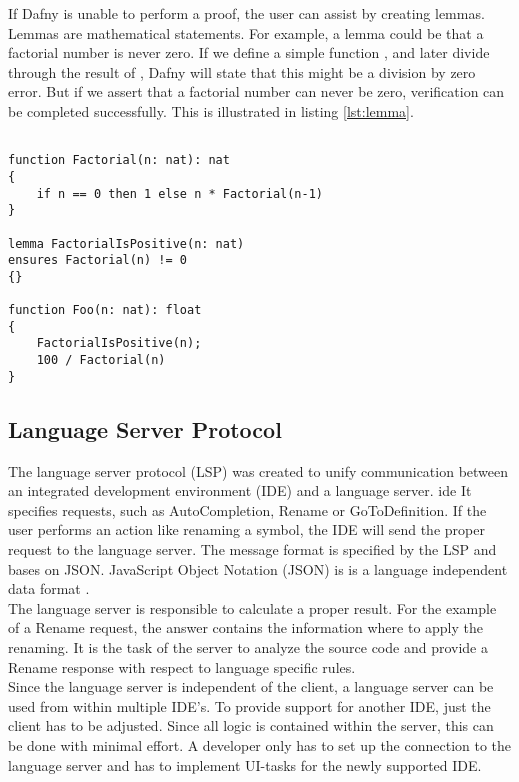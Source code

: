 If Dafny is unable to perform a proof, the user can assist by creating lemmas.
Lemmas are mathematical statements.
For example, a lemma could be that a factorial number is never zero.
If we define a simple function , and later divide through the result of , Dafny will state that this might be a division by zero error.
But if we assert that a factorial number can never be zero, verification can be completed successfully.
This is illustrated in listing \ref{lst:lemma}.
\begin{lstlisting}[language=dafny, caption={Lemma Example for Factorial}, captionpos=b, label={lst:lemma}]

function Factorial(n: nat): nat
{
    if n == 0 then 1 else n * Factorial(n-1)
}

lemma FactorialIsPositive(n: nat)
ensures Factorial(n) != 0
{}

function Foo(n: nat): float
{
    FactorialIsPositive(n);
    100 / Factorial(n)
}
\end{lstlisting}

\subsection{Language Server Protocol}
The language server protocol (LSP) was created to unify communication between an integrated development environment (IDE) and a language server. \Gls{ide}
It specifies requests, such as AutoCompletion, Rename or GoToDefinition.
If the user performs an action like renaming a symbol, the IDE will send the proper request to the language server.
The message format is specified by the LSP and bases on JSON. 
JavaScript Object Notation (JSON) is is a language independent data format \cite{json}. \\

The language server is responsible to calculate a proper result.
For the example of a Rename request, the answer contains the information where to apply the renaming.
It is the task of the server to analyze the source code and provide a Rename response with respect to language specific rules.\\

Since the language server is independent of the client, a language server can be used from within multiple IDE's.
To provide support for another IDE, just the client has to be adjusted.
Since all logic is contained within the server, this can be done with minimal effort.
A developer only has to set up the connection to the language server and has to implement UI-tasks for the newly supported IDE.

